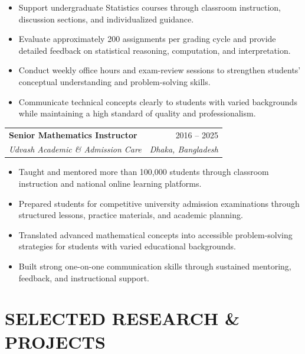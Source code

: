 \documentclass[10pt,letterpaper]{article}
\makeatletter
\newcommand{\resumeEntry}[4]{%
  \begin{tabularx}{\textwidth}{@{}Xr@{}}
    \textbf{#1} & #2 \\
    \textit{#3} & \textit{#4}
  \end{tabularx}%
}
\newenvironment{resumeItems}{%
  \begin{itemize}[
    label=\textbullet,
    leftmargin=14pt,
    labelsep=5pt,
    itemsep=0.5pt,
    topsep=1.0pt,
    parsep=0pt,
    partopsep=0pt
  ]
}{%
  \end{itemize}
}
\makeatother
\begin{document}
\begin{resumeItems}
  \item Support undergraduate Statistics courses through classroom instruction, discussion sections, and individualized guidance.

  \item Evaluate approximately 200 assignments per grading cycle and provide detailed feedback on statistical reasoning, computation, and interpretation.

  \item Conduct weekly office hours and exam-review sessions to strengthen students' conceptual understanding and problem-solving skills.

  \item Communicate technical concepts clearly to students with varied backgrounds while maintaining a high standard of quality and professionalism.
\end{resumeItems}

\vspace{1.3pt}

\resumeEntry
  {Senior Mathematics Instructor}
  {2016 -- 2025}
  {Udvash Academic \& Admission Care}
  {Dhaka, Bangladesh}

\begin{resumeItems}
  \item Taught and mentored more than 100,000 students through classroom instruction and national online learning platforms.

  \item Prepared students for competitive university admission examinations through structured lessons, practice materials, and academic planning.

  \item Translated advanced mathematical concepts into accessible problem-solving strategies for students with varied educational backgrounds.

  \item Built strong one-on-one communication skills through sustained mentoring, feedback, and instructional support.
\end{resumeItems}

\section*{SELECTED RESEARCH \& PROJECTS}
\end{document}

